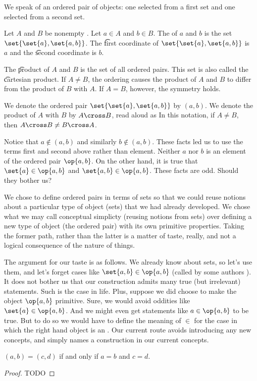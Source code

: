 
\sbasic










\sstart
{}


We speak of an ordered pair of objects: one selected from a first set and one selected from a second set.


Let $A$ and $B$ be nonempty .
Let $a \in A$ and $b \in B$.
The  of $a$ and $b$ is the set
$\set{\set{a}, \set{a, b}}$.
The \t{first coordinate} of $\set{\set{a}, \set{a, b}}$ is $a$ and the \t{second coordinate} is $b$.

The \t{product} of $A$ and $B$ is the set of all ordered pairs.
This set is also called the \t{cartesian product}.
If $A \neq B$, the ordering causes the product of $A$ and $B$ to differ from the product of
$B$ with $A$.
If $A = B$, however, the symmetry holds.


We denote the ordered pair $\set{\set{a},\set{a,b}}$ by $(a, b)$.
We denote the product of $A$ with $B$ by $A \cross B$, read aloud as 
In this notation, if $A \neq B$, then $A \cross B \neq B \cross A$.


Notice that $a \not\in (a, b)$ and similarly $b \not\in (a, b)$.
These facts led us to use the terms first and second  above rather than element.
Neither $a$ nor $b$ is an element of the ordered pair $\op{a, b}$.
On the other hand, it is true that $\set{a} \in \op{a, b}$ and $\set{a, b} \in \op{a, b}$.
These facts are odd.
Should they bother us?

We chose to define ordered pairs in terms of sets so that we could reuse notions about a particular type of object (sets) that we had already developed.
We chose what we may call conceptual simplicty (reusing notions from sets) over defining a new type of object (the ordered pair) with its own primitive properties.
Taking the former path, rather than the latter is a matter of taste, really, and not a logical consequence of the nature of things.

The argument for our taste is as follows.
We already know about sets, so let's use them, and let's forget cases like $\set{a, b} \in \op{a, b}$ (called by some authors ).
It does not bother us that our construction admits many true (but irrelevant) statements.
Such is the case in life.
Plus, suppose we did choose to make the object
$\op{a, b}$ primitive.
Sure, we would avoid oddities like $\set{a} \in \op{a, b}$.
And we might even get statements like $a \in \op{a, b}$ to be true.
But to do so we would have to define the meaning of $\in$ for the case in which the right hand object is an .
Our current route avoids introducing any new concepts, and simply names a construction in our current concepts.


\begin{prop}
$(a, b) = (c, d)$ if and only if $a = b$ and $c = d$.
  \begin{proof}
    TODO
  \end{proof}
\end{prop}
\strats
